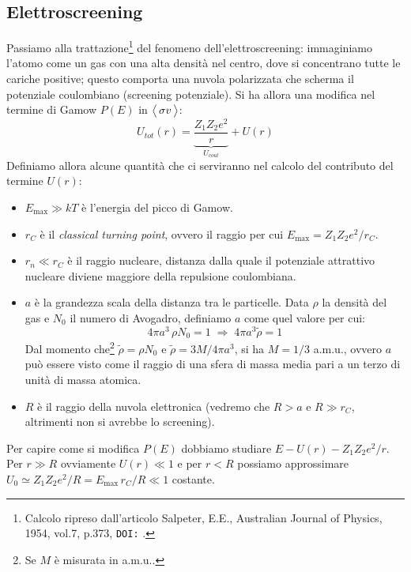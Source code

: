 \subsection{Elettroscreening}\label{0329-sec-screening}
Passiamo alla trattazione\footnote{Calcolo ripreso dall'articolo Salpeter, E.E., Australian Journal of Physics, 1954, vol.7, p.373, \texttt{DOI:} .} del fenomeno dell'elettroscreening: immaginiamo l'atomo come un gas con una alta densità nel centro, dove si concentrano tutte le cariche positive; questo comporta una nuvola polarizzata che scherma il potenziale coulombiano (screening potenziale). Si ha allora una modifica nel termine di Gamow $P(E)$ in $\bigl\langle\, \sigma v\, \bigr\rangle$:
$$U_{tot} (r) = \underbrace{\frac{Z_1Z_2e^2}{r}}_{U_{coul}} + U(r)$$
Definiamo allora alcune quantità che ci serviranno nel calcolo del contributo del termine $U(r)$:
\begin{itemize}
    \item $E_{\max{}}\gg kT$ è l'energia del picco di Gamow.
    \item $r_C$ è il \textit{classical turning point}, ovvero il raggio per cui $E_{\max{}} = Z_1Z_2e^2/r_C$.
    \item $r_n\ll r_C$ è il raggio nucleare, distanza dalla quale il potenziale attrattivo nucleare diviene maggiore della repulsione coulombiana.
    \item $a$ è la grandezza scala della distanza tra le particelle. Data $\rho$ la densità del gas e $N_0$ il numero di Avogadro, definiamo $a$ come quel valore per cui:
    $$4\pi a^3\,\rho N_0 =1 \;\Rightarrow\; 4\pi a^3 \tilde{\rho} = 1$$
    Dal momento che\footnote{Se $M$ è misurata in a.m.u..} $\tilde{\rho} = \rho N_0$ e $\tilde{\rho} = 3M/4\pi a^3$, si ha $M= 1/3$ a.m.u., ovvero $a$ può essere visto come il raggio di una sfera di massa media pari a un terzo di unità di massa atomica.
    \item $R$ è il raggio della nuvola elettronica (vedremo che $R>a$ e $R\gg r_C$, altrimenti non si avrebbe lo screening).
\end{itemize}
Per capire come si modifica $P(E)$ dobbiamo studiare $E-U(r)-Z_1Z_2e^2/r$. Per $r\gg R$ ovviamente $U(r)\ll 1$ e per $r<R$ possiamo approssimare $U_0 \simeq Z_1Z_2e^2/R = E_{\max{}}\, r_C/R\ll1$ costante.
